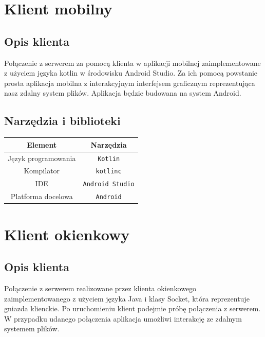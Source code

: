\documentclass[10pt,a4paper]{article}
\begin{document}
\section{Klient mobilny}

\subsection{Opis klienta}
Połączenie z serwerem za pomocą klienta w aplikacji mobilnej zaimplementowane z użyciem języka kotlin w środowisku Android Studio. Za ich pomocą powstanie prosta aplikacja mobilna z interakcyjnym interfejsem graficznym reprezentująca nasz zdalny system plików. Aplikacja będzie budowana na system Android.

\subsection{Narzędzia i biblioteki}
\bgroup
    \begin{center}
        \def\arraystretch{1.3}
        \begin{tabular}{c|c}
            \textbf{Element} & \textbf{Narzędzia} \\
            \hline
            Język programowania & \texttt{Kotlin} \\
            \hline
            Kompilator & \texttt{kotlinc} \\
            \hline
            IDE & \texttt{Android Studio} \\
            \hline
            Platforma docelowa & \texttt{Android}
        \end{tabular}
    \end{center}
\egroup

\section{Klient okienkowy}

\subsection{Opis klienta}
Połączenie z serwerem realizowane przez klienta okienkowego zaimplementowanego z użyciem języka Java i klasy Socket, która reprezentuje gniazda klienckie. Po uruchomieniu klient podejmie próbę połączenia z serwerem. W przypadku udanego połączenia aplikacja umożliwi interakcję ze zdalnym systemem plików.
\end{document}
